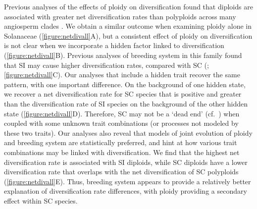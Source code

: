 Previous analyses of the effects of ploidy on diversification found that diploids are associated with greater net diversification rates than polyploids across many angiosperm clades \citep{mayrose_2011, mayrose_2015}. 
We obtain a similar outcome when examining ploidy alone in Solanaceae (\cref{figure:netdivall}A), but a consistent effect of ploidy on diversification is not clear when we incorporate a hidden factor linked to diversification (\cref{figure:netdivall}B).
%
Previous analyses of breeding system in this family found that SI may cause higher diversification rates, compared with SC (\citealt{goldberg_2010}; \cref{figure:netdivall}C).
Our analyses that include a hidden trait recover the same pattern, with one important difference.
On the background of one hidden state, we recover a net diversification rate for SC species that is positive and greater than the diversification rate of SI species on the background of the other hidden state (\cref{figure:netdivall}D).%
Therefore, SC may not be a `dead end' (cf.\ \citealt{igic_2013}) when coupled with some unknown trait combinations (or processes not modeled by these two traits). 
%
Our analyses also reveal that models of joint evolution of ploidy and breeding system are statistically preferred, and hint at how various trait combinations may be linked with diversification.
We find that the highest net diversification rate is associated with SI diploids, while SC diploids have a lower diversification rate that overlaps with the net diversification of SC polyploids (\cref{figure:netdivall}E).
Thus, breeding system appears to provide a relatively better explanation of diversification rate differences, with ploidy providing a secondary effect within SC species.


